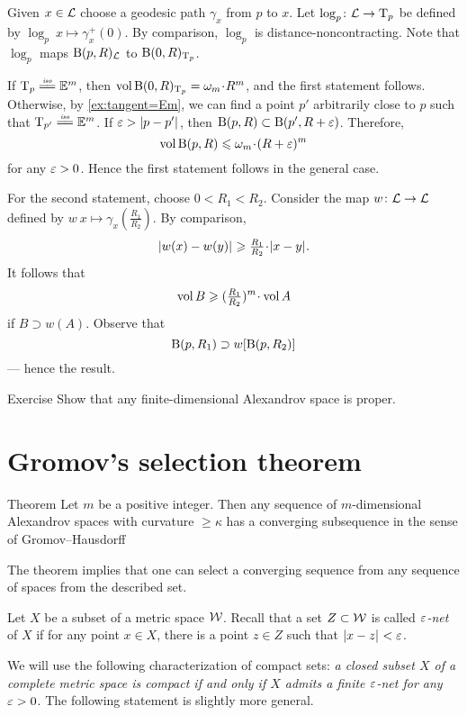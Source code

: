 Given $x\in\mathcal{L}$ choose a geodesic path $\gamma_x$ from $p$ to $x$.
Let $\log_p\colon\mathcal{L}\to \mathrm{T}_p$ be defined by $\log_p\:x\mapsto \gamma_x^+(0)$.
By comparison, $\log_p$ is distance-noncontracting.
Note that $\log_p$ maps $\mathrm{B}{}(p,R)_{\mathcal{L}}$ to $\mathrm{B}{}(0,R)_{\mathrm{T}_p}$.

If $\T_p\iso \EE^m$, then $\vol\oBall(0,R)_{\T_p}=\omega_m\cdot R^m$,
and the first statement follows.
Otherwise, by \ref{ex:tangent=Em}, we can find a point $p'$ arbitrarily close to $p$ such that $\T_{p'}\iso \EE^m$.
If $\eps>\dist{p}{p'}{}$, then $\mathrm{B}{}(p,R)\subset \mathrm{B}{}(p',R+\varepsilon)$.
Therefore,
\[\vol \oBall(p,R)\le \omega_m\cdot (R+\eps)^m\]
for any $\varepsilon>0$.
Hence the first statement follows in the general case.

For the second statement, choose $0<R_1<R_2$.
Consider the map $w\colon \mathcal{L}\to \mathcal{L}$ defined by $w\:x\mapsto \gamma_x(\tfrac {R_1}{R_2})$.
By comparison,
\[\dist{w(x)}{w(y)}{}\ge \tfrac {R_1}{R_2}\cdot \dist{x}{y}{}.\]
It follows that 
\[\vol B\ge (\tfrac {R_1}{R_2})^m\cdot\vol A\]
if $B\supset w(A)$.
Observe that 
\[\mathrm{B}{}(p,R_1) \supset w[\mathrm{B}{}(p,R_2)]\]
--- hence the result.
\qeds


\begin{thm}{Exercise}\label{ex:diam-compact}
Show that any finite-dimensional Alexandrov space is proper.
\end{thm}

\section{Gromov's selection theorem}

\begin{thm}{Theorem}\label{thm:gromov-compactness}
Let $m$ be a positive integer.
Then any sequence of $m$-dimensional Alexandrov spaces with curvature $\ge\kappa$ has a converging subsequence in the sense of Gromov--Hausdorff
\end{thm}

The theorem implies that one can select a converging sequence 
from any sequence of spaces from the described set.


Let $X$ be a subset of a metric space $\mathcal{W}$.
Recall that a set $Z\subset \mathcal{W}$ is called \emph{$\varepsilon$-net} of $X$ if for any point $x\in X$, there is a point $z\in Z$ such that $\dist{x}{z}{}<\eps$.

We will use the following characterization of compact sets: \textit{a closed subset $X$ of a complete metric space is compact if and only if $X$ admits a finite $\varepsilon$-net for any $\varepsilon>0$}.
The following statement is slightly more general.

